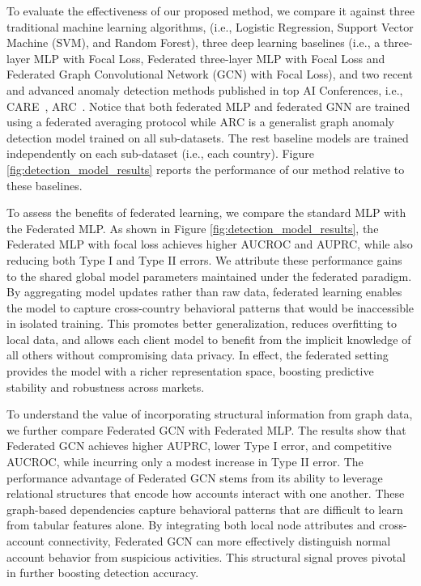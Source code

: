 To evaluate the effectiveness of our proposed method, we compare it against three traditional machine learning algorithms, (i.e., Logistic Regression, Support Vector Machine (SVM), and Random Forest), three deep learning baselines (i.e., a three-layer MLP with Focal Loss, Federated three-layer MLP with Focal Loss and Federated Graph Convolutional Network (GCN) with Focal Loss), and two recent and advanced anomaly detection methods published in top AI Conferences, i.e., CARE~\parencite{zheng2025cluster}, ARC~\parencite{liu2024arc}. Notice that both federated MLP and federated GNN are trained using a federated averaging protocol while ARC is a generalist graph anomaly detection model trained on all sub-datasets. The rest baseline models are trained independently on each sub-dataset (i.e., each country). Figure \ref{fig:detection_model_results} reports the performance of our method relative to these baselines. 

To assess the benefits of federated learning, we compare the standard MLP with the Federated MLP. As shown in Figure \ref{fig:detection_model_results}, the Federated MLP with focal loss achieves higher AUCROC and AUPRC, while also reducing both Type I and Type II errors. We attribute these performance gains to the shared global model parameters maintained under the federated paradigm. By aggregating model updates rather than raw data, federated learning enables the model to capture cross-country behavioral patterns that would be inaccessible in isolated training. This promotes better generalization, reduces overfitting to local data, and allows each client model to benefit from the implicit knowledge of all others without compromising data privacy. In effect, the federated setting provides the model with a richer representation space, boosting predictive stability and robustness across markets.

To understand the value of incorporating structural information from graph data, we further compare Federated GCN with Federated MLP. The results show that Federated GCN achieves higher AUPRC, lower Type I error, and competitive AUCROC, while incurring only a modest increase in Type II error. The performance advantage of Federated GCN stems from its ability to leverage relational structures that encode how accounts interact with one another. These graph-based dependencies capture behavioral patterns that are difficult to learn from tabular features alone. By integrating both local node attributes and cross-account connectivity, Federated GCN can more effectively distinguish normal account behavior from suspicious activities. This structural signal proves pivotal in further boosting detection accuracy.

